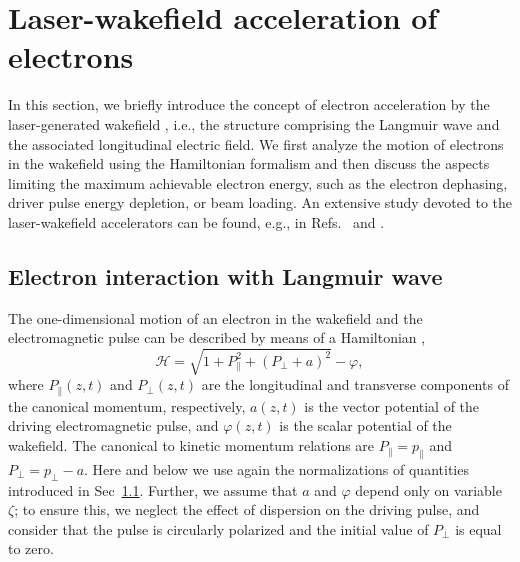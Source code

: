 \documentclass[10pt, a4paper, twoside, openright]{report}
\begin{document}

\section{Laser-wakefield acceleration of electrons\label{sec:lwfa}}
%

In this section, we briefly introduce the concept of electron acceleration by the laser-generated wakefield \cite{Tajima1979}, i.e., the structure comprising the Langmuir wave and the associated longitudinal electric field. We first analyze the motion of electrons in the wakefield using the Hamiltonian formalism and then discuss the aspects limiting the maximum achievable electron energy, such as the electron dephasing, driver pulse energy depletion, or beam loading. An extensive study devoted to the laser-wakefield accelerators can be found, e.g., in Refs.~ and .



\subsection{Electron interaction with Langmuir wave}
%

The one-dimensional motion of an electron in the wakefield and the electromagnetic pulse can be described by means of a Hamiltonian \cite{Esirkepov2006, Esarey2009, Bulanov2013, Bulanov2016},
\begin{equation}\label{eq:hamiltonian}
\mathcal{H} = \sqrt{1 + P_{\parallel}^2 + \left( P_{\bot} + a \right)^2} - \varphi,
\end{equation}
where $ P_{\parallel} \left( z, t \right) $ and $ P_{\bot} \left( z, t \right) $ are the longitudinal and transverse components of the canonical momentum, respectively, $ a \left( z, t \right) $ is the vector potential of the driving electromagnetic pulse, and $ \varphi \left( z, t \right) $ is the scalar potential of the wakefield. The canonical to kinetic momentum relations are $ P_{\parallel} = p_{\parallel} $ and $ P_{\bot} = p_{\bot} - a $. Here and below we use again the normalizations of quantities introduced in Sec~\ref{}. Further, we assume that $ a $ and $ \varphi $ depend only on variable $ \zeta $; to ensure this, we neglect the effect of dispersion on the driving pulse, and consider that the pulse is circularly polarized and the initial value of $ P_{\bot} $ is equal to zero.
\end{document}
